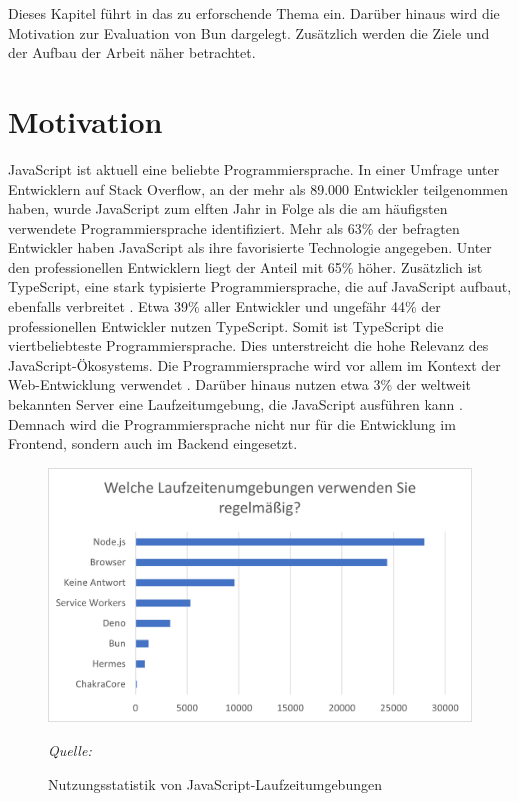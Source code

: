 \pagestyle{fancy-style}
 \label{ch:introduction}
Dieses Kapitel führt in das zu erforschende Thema ein. Darüber hinaus wird die Motivation zur Evaluation von Bun dargelegt. Zusätzlich werden die Ziele und der Aufbau der Arbeit näher betrachtet.

\section{Motivation} \label{sec:introduction-motivation}
JavaScript ist aktuell eine beliebte Programmiersprache. In einer Umfrage unter Entwicklern auf Stack Overflow, an der mehr als 89.000 Entwickler teilgenommen haben, wurde JavaScript zum elften Jahr in Folge als die am häufigsten verwendete Programmiersprache identifiziert. Mehr als 63\% der befragten Entwickler haben JavaScript als ihre favorisierte Technologie angegeben. Unter den professionellen Entwicklern liegt der Anteil mit 65\% höher. Zusätzlich ist TypeScript, eine stark typisierte Programmiersprache, die auf JavaScript aufbaut, ebenfalls verbreitet \cite{Microsoft.o.J.}. Etwa 39\% aller Entwickler und ungefähr 44\% der professionellen Entwickler nutzen TypeScript. Somit ist TypeScript die viertbeliebteste Programmiersprache. Dies unterstreicht die hohe Relevanz des JavaScript-Ökosystems.\cite{StackOverflow.2023}\newline
Die Programmiersprache wird vor allem im Kontext der Web-Entwicklung verwendet \cite{Brown.November2019}. Darüber hinaus nutzen etwa 3\% der weltweit bekannten Server eine Laufzeitumgebung, die JavaScript ausführen kann \cite{QSuccess.2023}. Demnach wird die Programmiersprache nicht nur für die Entwicklung im Frontend, sondern auch im Backend eingesetzt.\\

\begin{figure}[h]
	\centering
	\includegraphics[width=\linewidth]{./images/WhichRuntimesDoYouUseRegularly}
	\caption{Nutzungsstatistik von JavaScript-Laufzeitumgebungen}
	\label{fig:runtime-share}
	\textit{Quelle: \cite{Greif.2022}}
\end{figure}

